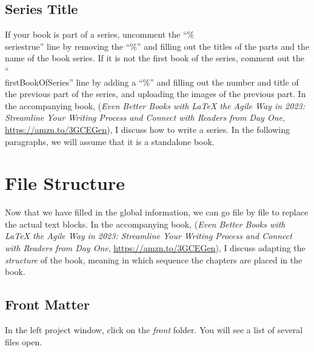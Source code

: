\subsection{Series Title}

If your book is part of a series, uncomment the ``\%\\seriestrue'' line by removing the ``\%'' and filling out the titles of the parts and the name of the book series. If it is not the first book of the series, comment out the ``\\firstBookOfSeries'' line by adding a ``\%'' and filling out the number and title of the previous part of the series, and uploading the images of the previous part. In the accompanying book, (\textit{Even Better Books with LaTeX the Agile Way in 2023: Streamline Your Writing Process and Connect with Readers from Day One}, \url{https://amzn.to/3GCEGen}), I discuss how to write a series. In the following paragraphs, we will assume that it is a standalone book.



\section{File Structure}
\label{filestructure:sec}

Now that we have filled in the global information, we can go file by file to replace the actual text blocks. In the accompanying book, (\textit{Even Better Books with LaTeX the Agile Way in 2023: Streamline Your Writing Process and Connect with Readers from Day One}, \url{https://amzn.to/3GCEGen}), I discuss adapting the \textit{structure} of the book, meaning in which sequence the chapters are placed in the book.

\subsection{Front Matter}
\label{frontmatter:sec}

In the left project window, click on the \textit{front} folder. You will see a list of several files open.

